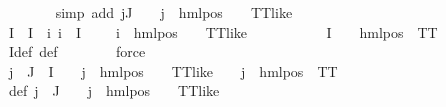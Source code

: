 \begin{isabellebody}
\ \ \ \ \ \ \isamarkupfalse%
\ {\isacharparenleft}{\kern0pt}simp\ add{\isacharcolon}{\kern0pt}\ {\isacartoucheopen}{\isasymforall}j{\isasymin}J{\isachardot}{\kern0pt}\ {\isasymexists}{\isasymalpha}\ {\isasymchi}{\isachardot}{\kern0pt}\ {\isasymPhi}\ j\ {\isacharequal}{\kern0pt}\ hml{\isacharunderscore}{\kern0pt}pos\ {\isasymalpha}\ {\isasymchi}\ {\isasymand}\ TT{\isacharunderscore}{\kern0pt}like\ {\isasymchi}{\isacartoucheclose}{\isacharparenright}{\kern0pt}\isanewline
\ \ \ \ \isamarkupfalse%
\ I{\isacharprime}{\kern0pt}\ \ {\isachardoublequoteopen}I{\isacharprime}{\kern0pt}\ {\isasymequiv}\ {\isacharbraceleft}{\kern0pt}i{\isachardot}{\kern0pt}\ i\ {\isasymin}\ I\ {\isasymand}\ {\isacharparenleft}{\kern0pt}{\isacharparenleft}{\kern0pt}{\isasymexists}{\isasymalpha}\ {\isasymchi}{\isachardot}{\kern0pt}\ {\isasymPhi}\ i\ {\isacharequal}{\kern0pt}\ hml{\isacharunderscore}{\kern0pt}pos\ {\isasymalpha}\ {\isasymchi}\ {\isasymand}\ TT{\isacharunderscore}{\kern0pt}like\ {\isasymchi}{\isacharparenright}{\kern0pt}{\isacharparenright}{\kern0pt}{\isacharbraceright}{\kern0pt}{\isachardoublequoteclose}\isanewline
\ \ \ \ \isamarkupfalse%
\ {\isachardoublequoteopen}{\isasymforall}{\isasympsi}\ {\isasymin}\ {\isasymPsi}\ {\isacharbackquote}{\kern0pt}\ I{\isacharprime}{\kern0pt}{\isachardot}{\kern0pt}\ {\isasymexists}{\isasymalpha}{\isachardot}{\kern0pt}\ {\isasympsi}\ {\isacharequal}{\kern0pt}\ hml{\isacharunderscore}{\kern0pt}pos\ {\isasymalpha}\ TT{\isachardoublequoteclose}\isanewline
\ \ \ \ \ \ \isamarkupfalse%
\ I{\isacharprime}{\kern0pt}{\isacharunderscore}{\kern0pt}def\ {\isasymPsi}{\isacharunderscore}{\kern0pt}def\isanewline
\ \ \ \ \ \ \isamarkupfalse%
\ force\isanewline
\ \ \ \ \isamarkupfalse%
\ {\isachardoublequoteopen}{\isasymforall}j\ {\isasymin}\ {\isacharparenleft}{\kern0pt}J\ {\isasymunion}\ I{\isacharprime}{\kern0pt}{\isacharparenright}{\kern0pt}{\isachardot}{\kern0pt}\ {\isasymexists}{\isasymalpha}\ {\isasymchi}{\isachardot}{\kern0pt}\ {\isasymPhi}\ j\ {\isacharequal}{\kern0pt}\ hml{\isacharunderscore}{\kern0pt}pos\ {\isasymalpha}\ {\isasymchi}\ {\isasymand}\ TT{\isacharunderscore}{\kern0pt}like\ {\isasymchi}\ {\isasymand}\ {\isasymPsi}\ j\ {\isacharequal}{\kern0pt}\ hml{\isacharunderscore}{\kern0pt}pos\ {\isasymalpha}\ TT{\isachardoublequoteclose}\ \isanewline
\ \ \ \ \ \ \isamarkupfalse%
\ {\isasymPsi}{\isacharunderscore}{\kern0pt}def\ {\isacartoucheopen}{\isasymforall}j\ {\isasymin}\ J{\isachardot}{\kern0pt}\ {\isacharparenleft}{\kern0pt}{\isasymexists}{\isasymalpha}\ {\isasymchi}{\isachardot}{\kern0pt}\ {\isasymPhi}\ j\ {\isacharequal}{\kern0pt}\ hml{\isacharunderscore}{\kern0pt}pos\ {\isasymalpha}\ {\isasymchi}\ {\isasymand}\ TT{\isacharunderscore}{\kern0pt}like\ {\isasymchi}{\isacharparenright}{\kern0pt}{\isacartoucheclose}\ \isanewline

\end{isabellebody}
